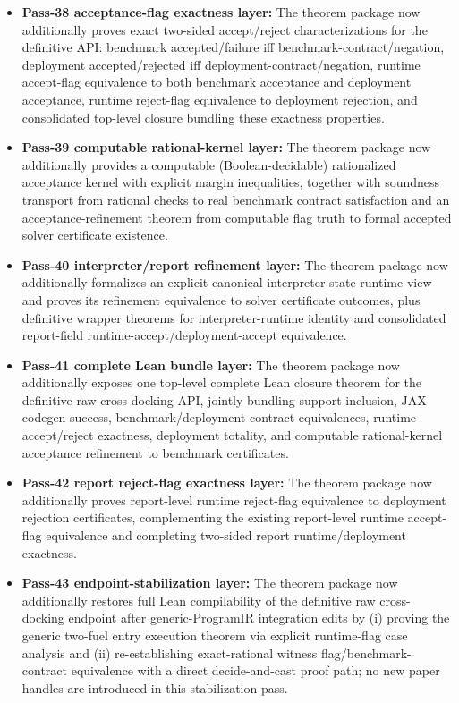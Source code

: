 \begin{itemize}
\item \textbf{Pass-38 acceptance-flag exactness layer:} The theorem package now additionally proves exact two-sided accept/reject characterizations for the definitive API: benchmark accepted/failure iff benchmark-contract/negation, deployment accepted/rejected iff deployment-contract/negation, runtime accept-flag equivalence to both benchmark acceptance and deployment acceptance, runtime reject-flag equivalence to deployment rejection, and consolidated top-level closure bundling these exactness properties.
\item \textbf{Pass-39 computable rational-kernel layer:} The theorem package now additionally provides a computable (Boolean-decidable) rationalized acceptance kernel with explicit margin inequalities, together with soundness transport from rational checks to real benchmark contract satisfaction and an acceptance-refinement theorem from computable flag truth to formal accepted solver certificate existence.
\item \textbf{Pass-40 interpreter/report refinement layer:} The theorem package now additionally formalizes an explicit canonical interpreter-state runtime view and proves its refinement equivalence to solver certificate outcomes, plus definitive wrapper theorems for interpreter-runtime identity and consolidated report-field runtime-accept/deployment-accept equivalence.
\item \textbf{Pass-41 complete Lean bundle layer:} The theorem package now additionally exposes one top-level complete Lean closure theorem for the definitive raw cross-docking API, jointly bundling support inclusion, JAX codegen success, benchmark/deployment contract equivalences, runtime accept/reject exactness, deployment totality, and computable rational-kernel acceptance refinement to benchmark certificates.
\item \textbf{Pass-42 report reject-flag exactness layer:} The theorem package now additionally proves report-level runtime reject-flag equivalence to deployment rejection certificates, complementing the existing report-level runtime accept-flag equivalence and completing two-sided report runtime/deployment exactness.
\item \textbf{Pass-43 endpoint-stabilization layer:} The theorem package now additionally restores full Lean compilability of the definitive raw cross-docking endpoint after generic-ProgramIR integration edits by (i) proving the generic two-fuel entry execution theorem via explicit runtime-flag case analysis and (ii) re-establishing exact-rational witness flag/benchmark-contract equivalence with a direct decide-and-cast proof path; no new paper handles are introduced in this stabilization pass.

\end{itemize}
